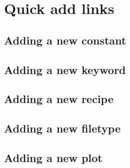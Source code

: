 \documentclass[a4paper,10pt,english]{report}
\begin{document}
\section{Quick add links}
\label{\detokenize{dev/developer_guide:quick-add-links}}

\subsection{Adding a new constant}
\label{\detokenize{dev/adding_new_constant:adding-a-new-constant}}\label{\detokenize{dev/adding_new_constant:add-new-constant}}\label{\detokenize{dev/adding_new_constant::doc}}

\subsection{Adding a new keyword}
\label{\detokenize{dev/adding_new_keyword:adding-a-new-keyword}}\label{\detokenize{dev/adding_new_keyword:adding-new-keyword}}\label{\detokenize{dev/adding_new_keyword::doc}}

\subsection{Adding a new recipe}
\label{\detokenize{dev/adding_new_recipe:adding-a-new-recipe}}\label{\detokenize{dev/adding_new_recipe:add-new-recipe}}\label{\detokenize{dev/adding_new_recipe::doc}}

\subsection{Adding a new filetype}
\label{\detokenize{dev/adding_new_filetype:adding-a-new-filetype}}\label{\detokenize{dev/adding_new_filetype:add-new-filetype}}\label{\detokenize{dev/adding_new_filetype::doc}}

\subsection{Adding a new plot}
\label{\detokenize{dev/adding_new_plot:adding-a-new-plot}}\label{\detokenize{dev/adding_new_plot:add-new-plot}}\label{\detokenize{dev/adding_new_plot::doc}}
\end{document}

